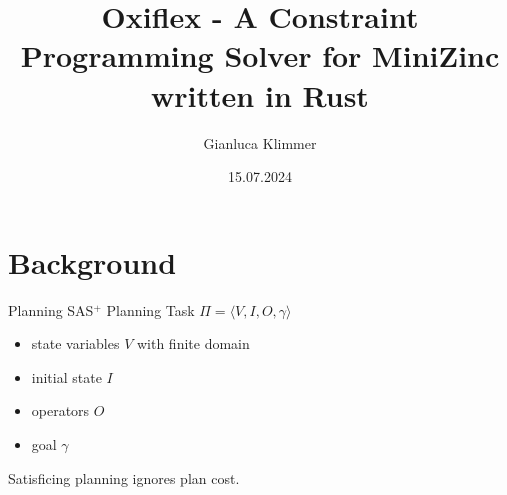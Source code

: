 \documentclass[mathserif,table]{gkibeamer-aaai}
\title[Oxiflex - Constraint Programming Solver for MiniZinc]{Oxiflex - A Constraint Programming Solver for MiniZinc written in Rust}
\author[G.\ Klimmer]{Gianluca Klimmer}
\institute[Basel]{University of Basel}
\date{15.07.2024}
\begin{document}
\section{Background}
\begin{frame}{Planning}
	SAS$^+$ Planning Task $\Pi=\langle V,I,O,\gamma \rangle$
	\begin{itemize}
		\item state variables $V$ with finite domain
		\item initial state $I$
		\item operators $O$
		\item goal $\gamma$
	\end{itemize}
	Satisficing planning ignores plan cost.
\end{frame}
\end{document}
